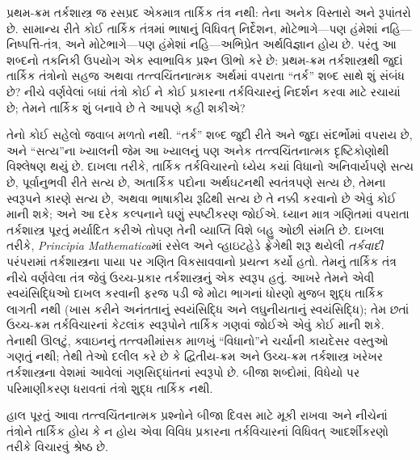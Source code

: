 \documentclass[../../../include/open-logic-section]{subfiles}
\begin{document}


પ્રથમ-ક્રમ તર્કશાસ્ત્ર જ રસપ્રદ એકમાત્ર તાર્કિક તંત્ર નથી: તેના અનેક
વિસ્તારો અને રૂપાંતરો છે. સામાન્ય રીતે કોઈ તાર્કિક તંત્રમાં ભાષાનું
વિધિવત્ નિર્દેશન, મોટેભાગે---પણ હંમેશાં નહિ---નિષ્પત્તિ-તંત્ર, અને
મોટેભાગે---પણ હંમેશાં નહિ---અભિપ્રેત અર્થવિજ્ઞાન હોય છે. પરંતુ આ
શબ્દનો તકનિકી ઉપયોગ એક સ્વાભાવિક પ્રશ્ન ઊભો કરે છે: પ્રથમ-ક્રમ
તર્કશાસ્ત્રથી જુદાં તાર્કિક તંત્રોનો સહજ અથવા તત્ત્વચિંતનાત્મક અર્થમાં
વપરાતા ``તર્ક'' શબ્દ સાથે શું સંબંધ છે? નીચે વર્ણવેલાં બધાં તંત્રો કોઈ
ને કોઈ પ્રકારના તર્કવિચારનું નિદર્શન કરવા માટે રચાયાં છે; તેમને
તાર્કિક શું બનાવે છે તે આપણે કહી શકીએ?

તેનો કોઈ સહેલો જવાબ મળતો નથી. ``તર્ક'' શબ્દ જુદી રીતે અને જુદા
સંદર્ભોમાં વપરાય છે, અને ``સત્ય''ના ખ્યાલની જેમ આ ખ્યાલનું પણ અનેક
તત્ત્વચિંતનાત્મક દૃષ્ટિકોણોથી વિશ્લેષણ થયું છે. દાખલા તરીકે, તાર્કિક
તર્કવિચારનો ધ્યેય કયાં વિધાનો અનિવાર્યપણે સત્ય છે, પૂર્વાનુભવી રીતે
સત્ય છે, અતાર્કિક પદોના અર્થઘટનથી સ્વતંત્રપણે સત્ય છે, તેમના સ્વરૂપને
કારણે સત્ય છે, અથવા ભાષાકીય રૂઢિથી સત્ય છે તે નક્કી કરવાનો છે એવું
કોઈ માની શકે; અને આ દરેક કલ્પનાને ઘણું સ્પષ્ટીકરણ જોઈએ. ધ્યાન માત્ર
ગણિતમાં વપરાતા તર્કશાસ્ત્ર પૂરતું મર્યાદિત કરીએ તોપણ તેની વ્યાપ્તિ
વિશે બહુ ઓછી સંમતિ છે. દાખલા તરીકે, \textit{Principia Mathematica}માં
રસેલ અને વ્હાઇટહેડે ફ્રેગેથી શરૂ થયેલી {\em તર્કવાદી} પરંપરામાં
તર્કશાસ્ત્રના પાયા પર ગણિત વિકસાવવાનો પ્રયત્ન કર્યો હતો. તેમનું
તાર્કિક તંત્ર નીચે વર્ણવેલા તંત્ર જેવું ઉચ્ચ-પ્રકાર તર્કશાસ્ત્રનું એક
સ્વરૂપ હતું. આખરે તેમને એવી સ્વયંસિદ્ધિઓ દાખલ કરવાની ફરજ પડી જે મોટા
ભાગનાં ધોરણો મુજબ શુદ્ધ તાર્કિક લાગતી નથી (ખાસ કરીને અનંતતાનું
સ્વયંસિદ્ધિ અને લઘુનીયતાનું સ્વયંસિદ્ધિ); તેમ છતાં ઉચ્ચ-ક્રમ તર્કવિચારનાં
કેટલાંક સ્વરૂપોને તાર્કિક ગણવાં જોઈએ એવું કોઈ માની શકે. તેનાથી ઊલટું,
ક્વાઇનનું તત્ત્વમીમાંસક માળખું ``વિધાનો''ને ચર્ચાની કાયદેસર વસ્તુઓ
ગણતું નથી; તેથી તેઓ દલીલ કરે છે કે દ્વિતીય-ક્રમ અને ઉચ્ચ-ક્રમ
તર્કશાસ્ત્ર ખરેખર તર્કશાસ્ત્રના વેશમાં આવેલાં ગણસિદ્ધાંતનાં સ્વરૂપો છે.
બીજા શબ્દોમાં, વિધેયો પર પરિમાણીકરણ ધરાવતાં તંત્રો શુદ્ધ તાર્કિક નથી.

હાલ પૂરતું આવા તત્ત્વચિંતનાત્મક પ્રશ્નોને બીજા દિવસ માટે મૂકી રાખવા
અને નીચેનાં તંત્રોને તાર્કિક હોય કે ન હોય એવા વિવિધ પ્રકારના
તર્કવિચારનાં વિધિવત્ આદર્શીકરણો તરીકે વિચારવું શ્રેષ્ઠ છે.
\end{document}
